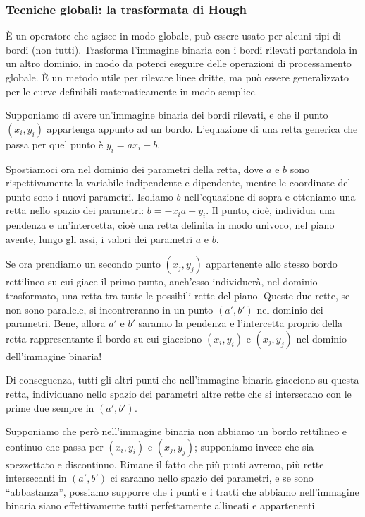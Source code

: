 \documentclass[a4paper,11pt]{article}
\begin{document}
\subsubsection{Tecniche globali: la trasformata di Hough}
È un operatore che agisce in modo globale, può essere usato per alcuni tipi di bordi (non tutti). Trasforma l'immagine binaria con i bordi rilevati
portandola in un altro dominio, in modo da poterci eseguire delle operazioni di processamento globale. È un metodo utile per
rilevare linee dritte, ma può essere generalizzato per le curve definibili matematicamente in modo semplice.
\par
Supponiamo di avere un'immagine binaria dei bordi rilevati, e che il punto $(x_i,y_i)$ appartenga appunto ad un bordo. L'equazione
di una retta generica che passa per quel punto è $y_i=ax_i+b$.
\par
Spostiamoci ora nel dominio dei parametri della retta, dove $a$ e $b$ sono rispettivamente la variabile indipendente e dipendente, mentre
le coordinate del punto sono i nuovi parametri. Isoliamo $b$ nell'equazione di sopra e otteniamo una retta nello spazio dei parametri: $b=-x_i a+y_i$. Il punto,
cioè, individua una pendenza e un'intercetta, cioè una retta definita in modo univoco, nel piano avente, lungo gli assi, i valori dei parametri $a$ e $b$.
\par
Se ora prendiamo un secondo punto $(x_j,y_j)$ appartenente allo stesso bordo rettilineo su cui giace il primo punto, anch'esso individuerà,
nel dominio trasformato, una retta tra tutte le possibili rette del piano. Queste due rette, se non sono parallele, si incontreranno in un punto
$(a',b')$ nel dominio dei parametri. Bene, allora $a'$ e $b'$ saranno la pendenza e l'intercetta proprio della retta rappresentante il bordo su cui giacciono
$(x_i,y_i)$ e $(x_j,y_j)$ nel dominio dell'immagine binaria!
\par
Di conseguenza, tutti gli altri punti che nell'immagine binaria giacciono su questa retta, individuano nello spazio dei parametri altre rette che si intersecano con
le prime due sempre in $(a',b')$.
\par
Supponiamo che però nell'immagine binaria non abbiamo un bordo rettilineo e continuo che passa per $(x_i,y_i)$ e $(x_j,y_j)$; supponiamo invece
che sia spezzettato e discontinuo. Rimane il fatto che più punti avremo, più rette intersecanti in $(a',b')$ ci saranno nello spazio dei parametri,
e se sono ``abbastanza'', possiamo supporre che i punti e i tratti che abbiamo nell'immagine binaria siano effettivamente tutti perfettamente allineati e appartenenti
\end{document}
